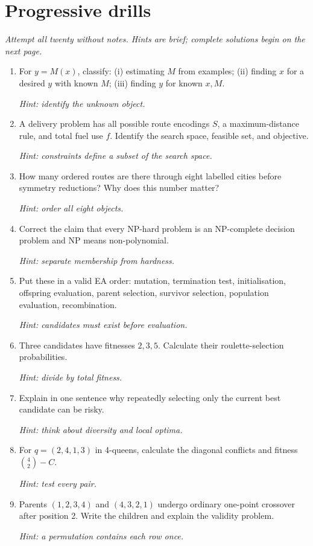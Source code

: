 \documentclass[11pt,a4paper]{article}
\begin{document}
\section{Progressive drills}
\textit{Attempt all twenty without notes. Hints are brief; complete solutions begin on the next page.}
\begin{enumerate}[label=\textbf{D\arabic*.}]
\item For $y=M(x)$, classify: (i) estimating $M$ from examples; (ii) finding $x$ for a desired $y$ with known $M$; (iii) finding $y$ for known $x,M$.\par\emph{Hint: identify the unknown object.}
\item A delivery problem has all possible route encodings $S$, a maximum-distance rule, and total fuel use $f$. Identify the search space, feasible set, and objective.\par\emph{Hint: constraints define a subset of the search space.}
\item How many ordered routes are there through eight labelled cities before symmetry reductions? Why does this number matter?\par\emph{Hint: order all eight objects.}
\item Correct the claim that every NP-hard problem is an NP-complete decision problem and NP means non-polynomial.\par\emph{Hint: separate membership from hardness.}
\item Put these in a valid EA order: mutation, termination test, initialisation, offspring evaluation, parent selection, survivor selection, population evaluation, recombination.\par\emph{Hint: candidates must exist before evaluation.}
\item Three candidates have fitnesses $2,3,5$. Calculate their roulette-selection probabilities.\par\emph{Hint: divide by total fitness.}
\item Explain in one sentence why repeatedly selecting only the current best candidate can be risky.\par\emph{Hint: think about diversity and local optima.}
\item For $q=(2,4,1,3)$ in 4-queens, calculate the diagonal conflicts and fitness $\binom42-C$.\par\emph{Hint: test every pair.}
\item Parents $(1,2,3,4)$ and $(4,3,2,1)$ undergo ordinary one-point crossover after position 2. Write the children and explain the validity problem.\par\emph{Hint: a permutation contains each row once.}

\end{enumerate}
\end{document}
